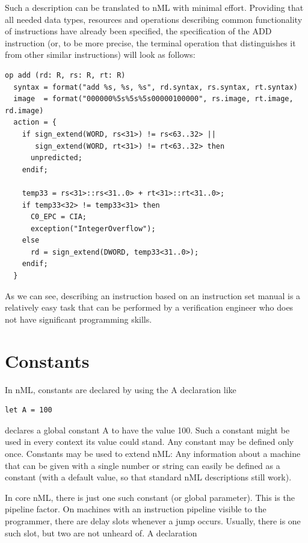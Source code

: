 \documentclass[oneside,final,14pt]{extreport}
\begin{document}
Such a description can be translated to nML with minimal effort. Providing that
all needed data types, resources and operations describing common functionality
of instructions have already been specified, the specification of the ADD
instruction (or, to be more precise, the terminal operation that distinguishes
it from other similar instructions) will look as follows:

\begin{lstlisting}
op add (rd: R, rs: R, rt: R)
  syntax = format("add %s, %s, %s", rd.syntax, rs.syntax, rt.syntax)
  image  = format("000000%5s%5s%5s00000100000", rs.image, rt.image, rd.image)
  action = {
    if sign_extend(WORD, rs<31>) != rs<63..32> ||
       sign_extend(WORD, rt<31>) != rt<63..32> then
      unpredicted;
    endif;

    temp33 = rs<31>::rs<31..0> + rt<31>::rt<31..0>;
    if temp33<32> != temp33<31> then
      C0_EPC = CIA;
      exception("IntegerOverflow");
    else
      rd = sign_extend(DWORD, temp33<31..0>);
    endif;
  }
\end{lstlisting}

As we can see, describing an instruction based on an instruction set manual is
a relatively easy task that can be performed by a verification engineer who
does not have significant programming skills.


\section{Constants}

In nML, constants are declared by using the A declaration like

\begin{lstlisting}
let A = 100
\end{lstlisting}

declares a global constant A to have the value 100. Such a constant might be used in every
context its value could stand. Any constant may be defined only once. Constants may be used
to extend nML: Any information about a machine that can be given with a single number
or string can easily be defined as a constant (with a default value, so that standard
nML descriptions still work).

In core nML, there is just one such constant (or global parameter).
This is the pipeline factor. On machines with an instruction pipeline visible to the programmer,
there are delay slots whenever a jump occurs. Usually, there is one such slot, but two are not
unheard of. A declaration
\end{document}
